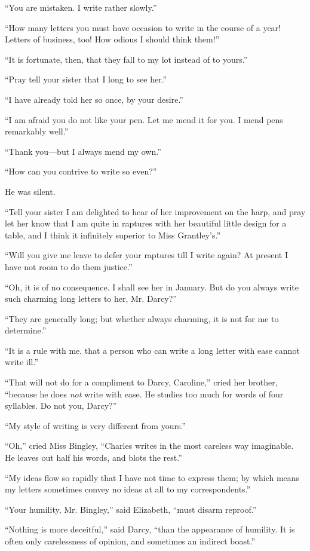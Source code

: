 \documentclass[12pt]{book}
\begin{document}
``You are mistaken. I write rather slowly.''

``How many letters you must have occasion to write in the course of a year! Letters of business, too! How odious I should think them!''

``It is fortunate, then, that they fall to my lot instead of to yours.''

``Pray tell your sister that I long to see her.''

``I have already told her so once, by your desire.''

``I am afraid you do not like your pen. Let me mend it for you. I mend pens remarkably well.''

``Thank you---but I always mend my own.''

``How can you contrive to write so even?''

He was silent.

``Tell your sister I am delighted to hear of her improvement on the harp, and pray let her know that I am quite in raptures with her beautiful little design for a table, and I think it infinitely superior to Miss Grantley's.''

``Will you give me leave to defer your raptures till I write again? At present I have not room to do them justice.''

``Oh, it is of no consequence. I shall see her in January. But do you always write such charming long letters to her, Mr. Darcy?''

``They are generally long; but whether always charming, it is not for me to determine.''

``It is a rule with me, that a person who can write a long letter with ease cannot write ill.''

``That will not do for a compliment to Darcy, Caroline,'' cried her brother, ``because he does \textit{not} write with ease. He studies too much for words of four syllables. Do not you, Darcy?''

``My style of writing is very different from yours.''

``Oh,'' cried Miss Bingley, ``Charles writes in the most careless way imaginable. He leaves out half his words, and blots the rest.''

``My ideas flow so rapidly that I have not time to express them; by which means my letters sometimes convey no ideas at all to my correspondents.''

``Your humility, Mr. Bingley,'' said Elizabeth, ``must disarm reproof.''

``Nothing is more deceitful,'' said Darcy, ``than the appearance of humility. It is often only carelessness of opinion, and sometimes an indirect boast.''
\end{document}
